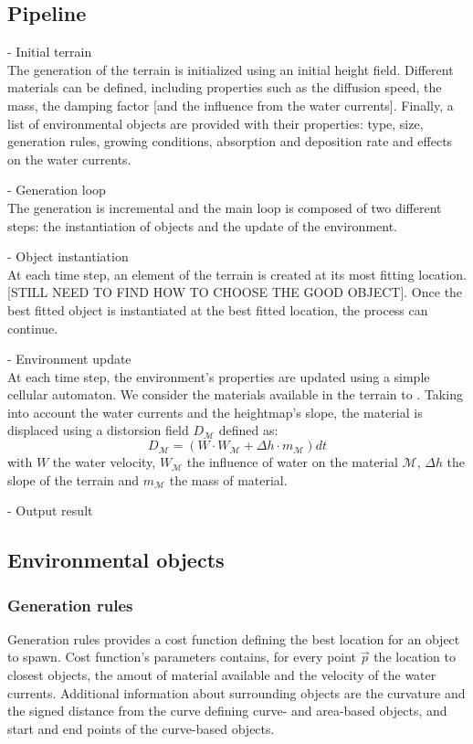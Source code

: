 \documentclass{egpubl}
\newcommand{\material}{\mathcal{M}}
\newcommand{\point}[1]{\vec{#1}}
\begin{document}
\subsection{Pipeline}
- Initial terrain \\
The generation of the terrain is initialized using an initial height field. Different materials can be defined, including properties such as the diffusion speed, the mass, the damping factor [and the influence from the water currents]. Finally, a list of environmental objects are provided with their properties: type, size, generation rules, growing conditions, absorption and deposition rate and effects on the water currents.


- Generation loop \\
The generation is incremental and the main loop is composed of two different steps: the instantiation of objects and the update of the environment.

- Object instantiation \\
At each time step, an element of the terrain is created at its most fitting location. [STILL NEED TO FIND HOW TO CHOOSE THE GOOD OBJECT]. Once the best fitted object is instantiated at the best fitted location, the process can continue.
	
- Environment update \\
At each time step, the environment's properties are updated using a simple cellular automaton. We consider the materials available in the terrain to . Taking into account the water currents and the heightmap's slope, the material is displaced using a distorsion field $D_\material$ defined as:
$$
D_\material = \left( W \cdot W_\material + \Delta h \cdot m_\material \right) dt
$$
with $W$ the water velocity, $W_\material$ the influence of water on the material $\material$, $\Delta h$ the slope of the terrain and $m_\material$ the mass of material.

- Output result


\subsection{Environmental objects}
\subsubsection{Generation rules}
Generation rules provides a cost function defining the best location for an object to spawn. Cost function's parameters contains, for every point $\point{p}$ the location to closest objects, the amout of material available and the velocity of the water currents. 
Additional information about surrounding objects are the curvature and the signed distance from the curve defining curve- and area-based objects, and start and end points of the curve-based objects.
\end{document}
